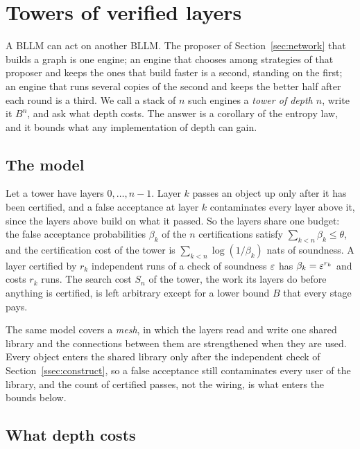 \section{Towers of verified layers}\label{sec:towers}

A BLLM can act on another BLLM. The proposer of Section~\ref{sec:network} that builds a graph is one engine; an engine that chooses among strategies of that proposer and keeps the ones that build faster is a second, standing on the first; an engine that runs several copies of the second and keeps the better half after each round is a third. We call a stack of $n$ such engines a \emph{tower of depth $n$}, write it $B^{n}$, and ask what depth costs. The answer is a corollary of the entropy law, and it bounds what any implementation of depth can gain.

\subsection{The model}

Let a tower have layers $0,\dots,n-1$. Layer $k$ passes an object up only after it has been certified, and a false acceptance at layer $k$ contaminates every layer above it, since the layers above build on what it passed. So the layers share one budget: the false acceptance probabilities $\beta_{k}$ of the $n$ certifications satisfy $\sum_{k<n}\beta_{k}\le\theta$, and the certification cost of the tower is $\sum_{k<n}\log(1/\beta_{k})$ nats of soundness. A layer certified by $r_{k}$ independent runs of a check of soundness $\varepsilon$ has $\beta_{k}=\varepsilon^{r_{k}}$ and costs $r_{k}$ runs. The search cost $S_{n}$ of the tower, the work its layers do before anything is certified, is left arbitrary except for a lower bound $B$ that every stage pays.

The same model covers a \emph{mesh}, in which the layers read and write one shared library and the connections between them are strengthened when they are used. Every object enters the shared library only after the independent check of Section~\ref{ssec:construct}, so a false acceptance still contaminates every user of the library, and the count of certified passes, not the wiring, is what enters the bounds below.

\subsection{What depth costs}

